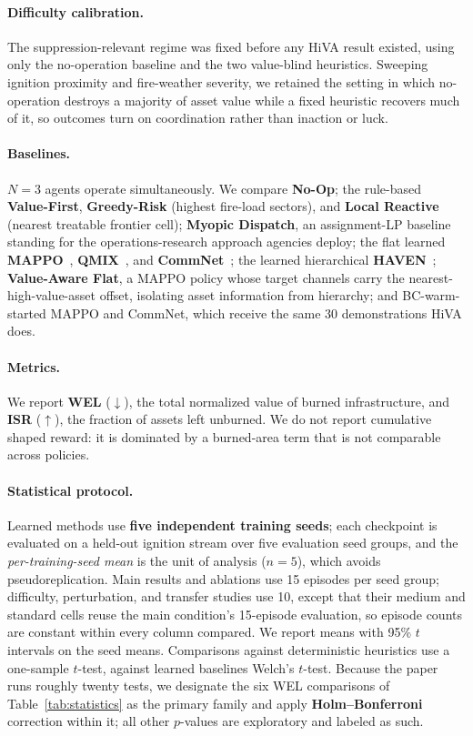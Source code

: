 \documentclass[letterpaper]{article}
\begin{document}
\paragraph{Difficulty calibration.} The suppression-relevant regime was fixed before any HiVA result existed, using only the no-operation baseline and the two value-blind heuristics. Sweeping ignition proximity and fire-weather severity, we retained the setting in which no-operation destroys a majority of asset value while a fixed heuristic recovers much of it, so outcomes turn on coordination rather than inaction or luck.

\paragraph{Baselines.} $N = 3$ agents operate simultaneously. We compare \textbf{No-Op}; the rule-based \textbf{Value-First}, \textbf{Greedy-Risk} (highest fire-load sectors), and \textbf{Local Reactive} (nearest treatable frontier cell); \textbf{Myopic Dispatch}, an assignment-LP baseline standing for the operations-research approach agencies deploy; the flat learned \textbf{MAPPO}~\citep{yu2022mappo}, \textbf{QMIX}~\citep{rashid2018qmix}, and \textbf{CommNet}~\citep{sukhbaatar2016learning}; the learned hierarchical \textbf{HAVEN}~\citep{xu2023haven}; \textbf{Value-Aware Flat}, a MAPPO policy whose target channels carry the nearest-high-value-asset offset, isolating asset information from hierarchy; and BC-warm-started MAPPO and CommNet, which receive the same $30$ demonstrations HiVA does.

\paragraph{Metrics.} We report \textbf{WEL} ($\downarrow$), the total normalized value of burned infrastructure, and \textbf{ISR} ($\uparrow$), the fraction of assets left unburned. We do not report cumulative shaped reward: it is dominated by a burned-area term that is not comparable across policies.

\paragraph{Statistical protocol.} Learned methods use \textbf{five independent training seeds}; each checkpoint is evaluated on a held-out ignition stream over five evaluation seed groups, and the \emph{per-training-seed mean} is the unit of analysis ($n=5$), which avoids pseudoreplication. Main results and ablations use 15 episodes per seed group; difficulty, perturbation, and transfer studies use 10, except that their medium and standard cells reuse the main condition's 15-episode evaluation, so episode counts are constant within every column compared. We report means with 95\% $t$ intervals on the seed means. Comparisons against deterministic heuristics use a one-sample $t$-test, against learned baselines Welch's $t$-test. Because the paper runs roughly twenty tests, we designate the six WEL comparisons of Table~\ref{tab:statistics} as the primary family and apply \textbf{Holm--Bonferroni} correction within it; all other $p$-values are exploratory and labeled as such.
\end{document}
